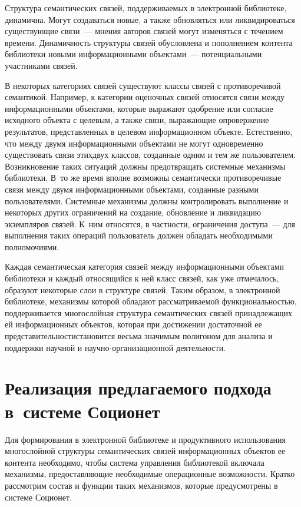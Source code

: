 \begin{multicols}{2}
{}
  
  Структура семантических связей, под\-дер\-жи\-ва\-емых в электронной 
библиотеке, динамична. Могут создаваться новые, а также обновляться или 
ликвидироваться существующие связи~--- мнения авторов связей могут 
изменяться с течением времени. Динамичность структуры связей обусловлена и 
пополнением контента библиотеки новыми информационными объектами~--- 
потенциальными участниками связей. 
  
  В некоторых категориях связей существуют клас\-сы связей с противоречивой 
семантикой. Например, к категории оценочных связей относятся связи между 
информационными объектами, которые выражают одобрение или согласие 
исходного объекта с целевым, а также связи, выражающие опровержение 
результатов, представленных в целевом информационном объекте. 
Естественно, что между двумя информационными объектами не могут 
одновременно существовать связи этих\linebreak двух классов, созданные одним и тем 
же пользователем. Возникновение таких ситуаций долж\-ны предотвращать 
системные механизмы библиотеки. В~то же время вполне возможны 
семантически противоре\-чивые связи между двумя информационными 
объектами, созданные разными пользователями. Системные механизмы 
должны контролировать выполнение и некоторых других ограничений на 
создание, обновление и ликвидацию экземпляров связей. К~ним относятся, в 
частности, ограничения доступа~--- для выполнения таких операций 
пользователь должен обладать необходимыми полномочиями. 
  
  Каждая семантическая категория связей между информационными 
объектами библиотеки и каж\-дый относящийся к ней класс связей, как уже 
отмечалось, образуют некоторые слои в структуре связей. Таким образом, в 
электронной библиотеке, механизмы которой обладают рас\-смат\-ри\-ва\-емой\linebreak 
функциональностью, поддерживается многослойная структура семантических 
связей принадлежащих ей информационных объектов, которая при достижении 
достаточной ее представительности\linebreak становится весьма значимым полигоном 
для анализа и поддержки научной и на\-уч\-но-ор\-га\-ни\-за\-ци\-он\-ной 
деятельности. 

\section{Реализация предлагаемого подхода в~системе Соционет}

  Для формирования в электронной библиотеке и продуктивного 
использования многослойной структуры семантических связей 
информационных объектов ее контента необходимо, чтобы система управления 
библиотекой включала механизмы, предоставляющие необходимые 
операционные возможности. Кратко рассмотрим состав и функции таких 
механизмов, которые предусмотрены в системе Соционет.
  

\end{multicols}
